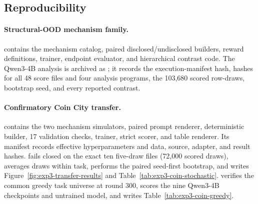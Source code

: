 \begin{center}
\begin{minipage}{.82\linewidth}
\centering
{}
\label{tab:exp3b-update-seed-results}
\scriptsize
\setlength{\tabcolsep}{4pt}
\resizebox{\linewidth}{!}{%

}
\end{minipage}
\end{center}



\subsection{Reproducibility}
\label{app:exp3-repro}

\paragraph{Structural-OOD mechanism family.}
 contains the mechanism catalog,
paired disclosed/undisclosed builders, reward definitions, trainer, endpoint
evaluator, and hierarchical contrast code. The Qwen3-4B analysis is
archived as ; it records the
execution-manifest hash, hashes for all 48 score files and four analysis programs,
the 103,680 scored row-draws, bootstrap seed, and every reported contrast.

\paragraph{Confirmatory Coin City transfer.}
 contains the two mechanism
simulators, paired prompt renderer, deterministic builder, 17 validation checks,
trainer, strict scorer, and table renderer. Its manifest records effective
hyperparameters and data, source, adapter, and result hashes.
 fails closed on the exact ten
five-draw files (72,000 scored draws), averages draws within task, performs the
paired seed-first bootstrap, and writes Figure~\ref{fig:exp3-transfer-results}
and Table~\ref{tab:exp3-coin-stochastic}. 
verifies the common greedy task universe at round 300, scores the nine Qwen3-4B
checkpoints and untrained model, and writes Table~\ref{tab:exp3-coin-greedy}.


